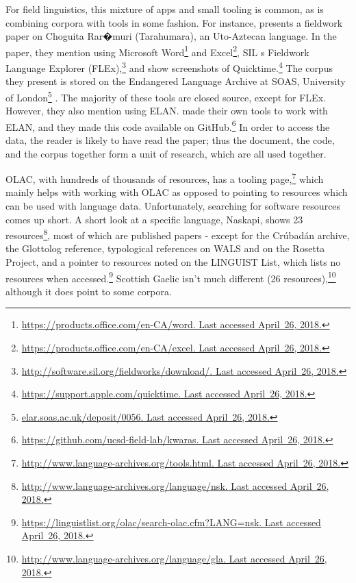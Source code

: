 For field linguistics, this mixture of apps and small tooling is common, as is combining corpora with tools in some fashion. For instance, \citet{caballero2017choguita} presents a fieldwork paper on Choguita Rar�muri (Tarahumara), an Uto-Aztecan language. In the paper, they mention using Microsoft Word\footnote{\href{https://products.office.com/en-CA/word}{https://products.office.com/en-CA/word. Last accessed April~26, 2018.}} and Excel\footnote{\href{https://products.office.com/en-CA/excel}{https://products.office.com/en-CA/excel. Last accessed April~26, 2018.}}, SIL
s Fieldwork Language Explorer (FLEx),\footnote{\href{http://software.sil.org/fieldworks/download/.}{http://software.sil.org/fieldworks/download/. Last accessed April~26, 2018.}} and show screenshots of Quicktime.\footnote{\href{https://support.apple.com/quicktime}{https://support.apple.com/quicktime. Last accessed April~26, 2018.}} The corpus they present is stored on the Endangered Language Archive at SOAS, University of London\footnote{\href{elar.soas.ac.uk/deposit/0056}{elar.soas.ac.uk/deposit/0056. Last accessed April~26, 2018.}} \citep{caballero2009data}. The majority of these tools are closed source, except for FLEx. However, they also mention using ELAN. \citet{caballero2017choguita} made their own tools to work with ELAN, and they made this code available on GitHub.\footnote{\href{https://github.com/ucsd-field-lab/kwaras}{https://github.com/ucsd-field-lab/kwaras. Last accessed April~26, 2018.}} In order to access the data, the reader is likely to have read the paper; thus the document, the code, and the corpus together form a unit of research, which are all used together.

OLAC, with hundreds of thousands of resources, has a tooling page,\footnote{\href{http://www.language-archives.org/tools.html}{http://www.language-archives.org/tools.html. Last accessed April~26, 2018.}} which mainly helps with working with OLAC as opposed to pointing to resources which can be used with language data. Unfortunately, searching for software resources comes up short. A short look at a specific language, Naskapi, shows 23 resources\footnote{\href{http://www.language-archives.org/language/nsk}{http://www.language-archives.org/language/nsk. Last accessed April~26, 2018.}}, most of which are published papers - except for the Cr\'ubad\'an archive, the Glottolog reference, typological references on WALS and on the Rosetta Project, and a pointer to resources noted on the LINGUIST List, which lists no resources when accessed.\footnote{\href{https://linguistlist.org/olac/search-olac.cfm?LANG=nsk}{https://linguistlist.org/olac/search-olac.cfm?LANG=nsk. Last accessed April~26, 2018.}} Scottish Gaelic isn't much different (26 resources),\footnote{\href{http://www.language-archives.org/language/gla}{http://www.language-archives.org/language/gla. Last accessed April~26, 2018.}} although it does point to some corpora.

